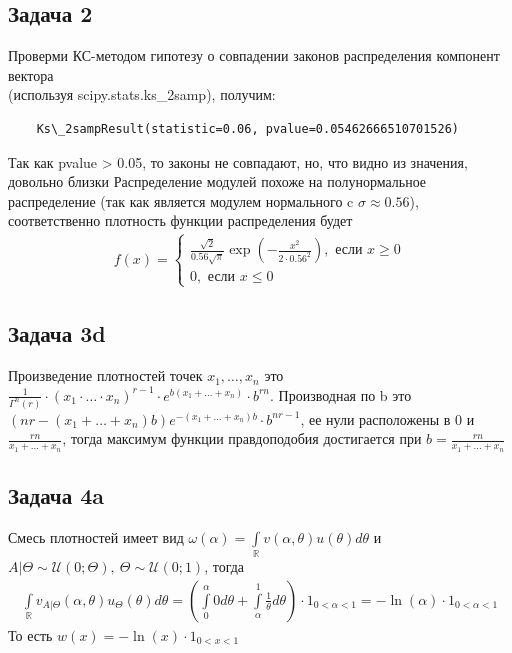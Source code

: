 \subsection*{Задача 2}
Проверми КС-методом гипотезу о совпадении законов распределения компонент вектора\\
(используя scipy.stats.ks\_2samp), получим:
\begin{verbatim}
    Ks\_2sampResult(statistic=0.06, pvalue=0.05462666510701526)
\end{verbatim}
Так как pvalue > 0.05, то законы не совпадают, но, что видно из значения, довольно близки
\vskip 0.1in \noindent
Распределение модулей похоже на полунормальное распределение (так как является модулем нормального c $\sigma \approx 0.56$), соответственно плотность функции распределения будет
\begin{gather*}
f(x) =
\begin{cases}
    \frac{\sqrt{2}}{0.56 \sqrt{\pi}} \exp\left(-\frac{x^2}{2 \cdot 0.56^2}\right), \text{ если } x \geqslant 0\\
    0, \text{ если } x \leqslant 0
\end{cases}
\end{gather*}
\vskip 0.4in



\subsection*{Задача 3d}
Произведение плотностей точек $x_1, \ldots, x_n$ это $\frac{1}{\Gamma^n(r)} \cdot (x_1 \cdot \ldots \cdot x_n)^{r-1} \cdot e^{b(x_1 + \ldots + x_n)} \cdot b^{rn}$. Производная по b это $(nr - (x_1 + \ldots + x_n)b)e^{-(x_1 + \ldots + x_n)b} \cdot b^{nr-1}$, ее нули расположены в $0$ и $\frac{rn}{x_1 + \ldots + x_n}$, тогда максимум функции правдоподобия достигается при $b = \frac{rn}{x_1 + \ldots + x_n}$
\vskip 0.4in



\subsection*{Задача 4a}
Смесь плотностей имеет вид $\omega(\alpha) = \int\limits_{\mathbb{R}} v(\alpha, \theta) u(\theta) d \theta$ и $A| \Theta \sim \mathcal{U}(0; \Theta),\ \Theta \sim \mathcal{U}(0; 1)$, тогда
\begin{gather*}
    \int\limits_{\mathbb{R}} v_{A|\Theta}(\alpha, \theta) u_{\Theta}(\theta) d \theta
    = \left(\int\limits_{0}^{\alpha} 0 d \theta + \int\limits_{\alpha}^{1} \frac{1}{\theta} d \theta\right) \cdot 1_{0 < \alpha < 1}
    = -\ln(\alpha) \cdot 1_{0 < \alpha < 1}
\end{gather*}
То есть $w(x) = -\ln(x) \cdot 1_{0 < x < 1}$

